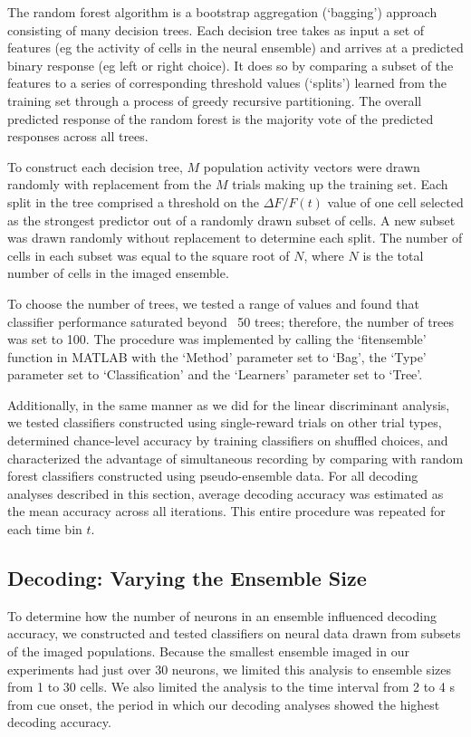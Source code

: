 The random forest algorithm is a bootstrap aggregation (‘bagging’) approach consisting of many decision trees. Each decision tree takes as input a set of features (eg the activity of cells in the neural ensemble) and arrives at a predicted binary response (eg left or right choice). It does so by comparing a subset of the features to a series of corresponding threshold values (‘splits’) learned from the training set through a process of greedy recursive partitioning. The overall predicted response of the random forest is the majority vote of the predicted responses across all trees. 

To construct each decision tree, $M$ population activity vectors were drawn randomly with replacement from the $M$ trials making up the training set. Each split in the tree comprised a threshold on the $\Delta F/F(t)$ value of one cell selected as the strongest predictor out of a randomly drawn subset of cells. A new subset was drawn randomly without replacement to determine each split. The number of cells in each subset was equal to the square root of $N$, where $N$ is the total number of cells in the imaged ensemble. 

To choose the number of trees, we tested a range of values and found that classifier performance saturated beyond ~50 trees; therefore, the number of trees was set to 100. The procedure was implemented by calling the ‘fitensemble’ function in MATLAB with the ‘Method’ parameter set to ‘Bag’, the ‘Type’ parameter set to ‘Classification’ and the ‘Learners’ parameter set to ‘Tree’. 

Additionally, in the same manner as we did for the linear discriminant analysis, we tested classifiers constructed using single-reward trials on other trial types, determined chance-level accuracy by training classifiers on shuffled choices, and characterized the advantage of simultaneous recording by comparing with random forest classifiers constructed using pseudo-ensemble data. For all decoding analyses described in this section, average decoding accuracy was estimated as the mean accuracy across all iterations. This entire procedure was repeated for each time bin $t$.

\subsection*{Decoding: Varying the Ensemble Size}
To determine how the number of neurons in an ensemble influenced decoding accuracy, we constructed and tested classifiers on neural data drawn from subsets of the imaged populations. Because the smallest ensemble imaged in our experiments had just over 30 neurons, we limited this analysis to ensemble sizes from 1 to 30 cells. We also limited the analysis to the time interval from 2 to 4 s from cue onset, the period in which our decoding analyses showed the highest decoding accuracy. 

